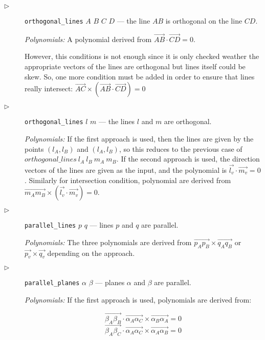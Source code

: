 \documentclass[final,1p,times,authoryear]{elsarticle}
\begin{document}
\begin{description}
\item[$\triangleright$] {\tt orthogonal\_lines} $A$ $B$ $C$ $D$ ---
  the line $AB$ is orthogonal on the line $CD$.

{\em Polynomials:} A polynomial derived from $\overrightarrow{AB}
\cdot \overrightarrow{CD} = 0$.

However, this conditions is not enough since it is only checked
weather the appropriate vectors of the lines are orthogonal but lines
itself could be skew. So, one more condition must be added in order to
ensure that lines really intersect: $\overrightarrow{AC} \times
(\overrightarrow{AB} \cdot \overrightarrow{CD}) = 0$

\item[$\triangleright$] {\tt orthogonal\_lines} $l$ $m$ --- the lines
  $l$ and $m$ are orthogonal.

{\em Polynomials:} If the first approach is used, then the lines are
given by the points $(l_A, l_B)$ and $(l_A, l_B)$, so this reduces to
the previous case of $orthogonal\_lines\ l_A\ l_B\ m_A\ m_B$. If the
second approach is used, the direction vectors of the lines are given
as the input, and the polynomial is $\overrightarrow{l_v} \cdot
\overrightarrow{m_v} = 0$. Similarly for intersection condition,
polynomial are derived from $\overrightarrow{m_Am_B} \times
(\overrightarrow{l_v} \cdot \overrightarrow{m_v}) = 0$.

\item[$\triangleright$] {\tt parallel\_lines} $p$ $q$ --- lines $p$
  and $q$ are parallel.

{\em Polynomials:} The three polynomials are derived from
$\overrightarrow{p_Ap_B} \times \overrightarrow{q_Aq_B}$ or
$\overrightarrow{p_v} \times \overrightarrow{q_v}$ depending on the
approach.

\item[$\triangleright$] {\tt parallel\_planes} $\alpha$ $\beta$ ---
  planes $\alpha$ and $\beta$ are parallel.

{\em Polynomials:} If the first approach is used, polynomials are
derived from:

$$\overrightarrow{\beta_A\beta_B}\cdot \overrightarrow{\alpha_A\alpha_C} \times \overrightarrow{\alpha_B\alpha_A} = 0$$
$$\overrightarrow{\beta_A\beta_C}\cdot \overrightarrow{\alpha_A\alpha_C} \times \overrightarrow{\alpha_A\alpha_B} = 0$$


\end{description}
\end{document}
